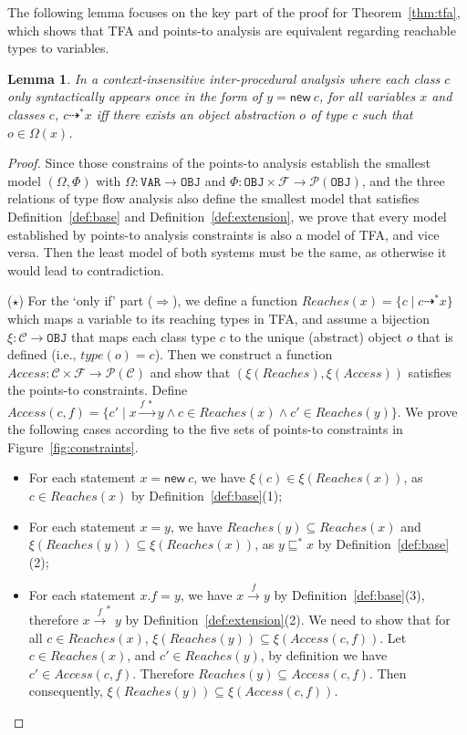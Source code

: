 \documentclass{fac}
\newtheorem{Lemma}{Lemma}
\newcommand{\keyword}[1]{\mathsf{#1}}
\newcommand{\kwnew}[0]{\keyword{new}}
\newcommand\Var{\mathtt{VAR}}
\newcommand\Obj{\mathtt{OBJ}}
\newcommand{\VPT}{\Omega}
\newcommand{\HPT}{\Phi}
\newcommand{\Class}{\mathcal{C}}
\newcommand{\Field}{\mathcal{F}}
\newcommand{\less}{\sqsubseteq}
\newcommand{\tflow}{\dashrightarrow}
\newcommand{\hflow}{\longrightarrow}
\newcommand{\lhflow}[1]{\stackrel{#1}{\hflow}}
\newcommand\set[1]{\{#1\}}
\newcommand\power{\mathcal{P}}
\begin{document}
The following lemma focuses on the key part of the proof for Theorem~\ref{thm:tfa}, which shows that TFA and points-to analysis are equivalent regarding reachable types to variables. %

\begin{Lemma}\label{lem:tfa-inter}
In a context-insensitive inter-procedural analysis where each class $c$ only syntactically appears once in the form of $y = \kwnew\ c$, for all variables $x$ and classes $c$, $c\tflow^*x$ iff there exists an object abstraction $o$ of type $c$ such that $o\in\VPT(x)$.
\end{Lemma}
\begin{proof}
Since those constrains of the points-to analysis establish the smallest model $(\VPT, \HPT)$ with $\VPT:\Var\rightarrow\Obj$ and $\HPT:\Obj\times\Field\rightarrow\power(\Obj)$, and the three relations of type flow analysis also define the smallest model that satisfies Definition~\ref{def:base} and Definition~\ref{def:extension}, we prove that every model established by points-to analysis constraints is also a model of TFA, and vice versa. Then the least model of both systems must be the same, as otherwise it would lead to contradiction.

\medskip

($\star$) For the `only if' part ($\Rightarrow$), we define a function $Reaches(x)=\set{c\mid c\tflow^* x}$ which maps a variable to its reaching types in TFA, and assume a bijection $\xi:\Class\rightarrow\Obj$ that maps each class type $c$ to the unique (abstract) object $o$ that is defined (i.e., $type(o)=c$). Then we construct a function $Access:\Class\times\Field\rightarrow\power(\Class)$ and show that $(\xi(Reaches),\xi(Access))$ satisfies the points-to constraints. Define $Access(c,f)=\set{c'\mid x\lhflow{f\ *}y\wedge c\in Reaches(x)\wedge c'\in Reaches(y)}$. We prove the following cases according to the five sets of points-to constraints in Figure~\ref{fig:constraints}.
\begin{itemize}
\item For each statement $x = \kwnew\ c$, we have $\xi(c)\in\xi(Reaches(x))$, as $c\in Reaches(x)$ by Definition~\ref{def:base}(1);
\item For each statement $x = y$, we have $Reaches(y)\subseteq Reaches(x)$ and $\xi(Reaches(y))\subseteq\xi(Reaches(x))$, as $y\less^*x$ by Definition~\ref{def:base}(2);
\item For each statement $x.f = y$, we have $x\lhflow{f}y$ by Definition~\ref{def:base}(3), therefore $x\lhflow{f}^*y$ by Definition~\ref{def:extension}(2). We need to show that for all $c\in Reaches(x)$, $\xi(Reaches(y))\subseteq \xi(Access(c,f))$.
      Let $c\in Reaches(x)$, and $c'\in Reaches(y)$, by definition we have $c'\in Access(c,f)$. Therefore $Reaches(y)\subseteq Access(c,f)$. Then consequently, $\xi(Reaches(y))\subseteq \xi(Access(c,f))$.


\end{itemize}
\end{proof}
\end{document}
